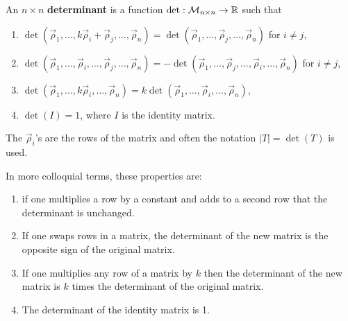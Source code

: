 \begin{definition} \label{defn:det}
An $n \times n$ \textbf{determinant} is a function $\det: {\cal M}_{n \times n} \rightarrow \mathbb{R}$ such that
%
\begin{enumerate}
\item $\det(\vec{\rho}_1,\ldots, k \vec{\rho}_i + \vec{\rho}_j, \ldots, \vec{\rho}_n) = \det(\vec{\rho}_1, \ldots, \vec{\rho}_j , \ldots, \vec{\rho}_n)$ for $i \neq j$, 
\item $\det(\vec{\rho}_1,\ldots, \vec{\rho}_i, \ldots,  \vec{\rho}_j, \ldots, \vec{\rho}_n) = -\det(\vec{\rho}_1, \ldots, \vec{\rho}_j, \ldots, \vec{\rho}_i, \ldots, \vec{\rho}_n)$ for $i \neq j$, 
\item $\det(\vec{\rho}_1,\ldots, k \vec{\rho}_i, \ldots, \vec{\rho}_n) = k \det(\vec{\rho}_1, \ldots, \vec{\rho}_i , \ldots, \vec{\rho}_n)$,
\item $\det(I) =1$, where $I$ is the identity matrix. 
\end{enumerate}
The $\vec{\rho}_i$'s are the rows of the matrix and often the notation $|T| = \det(T)$ is used.  
\end{definition}

In more colloquial terms, these properties are:

\begin{enumerate}
\item if one multiplies a row by a constant and adds to a second row that the determinant is unchanged. 
\item If one swaps rows in a matrix, the determinant of the new matrix is the opposite sign of the original matrix.
\item If one multiplies any row of a matrix by $k$ then the determinant of the new matrix is $k$ times the determinant of the original matrix. 
\item The determinant of the identity matrix is 1.  
\end{enumerate}

